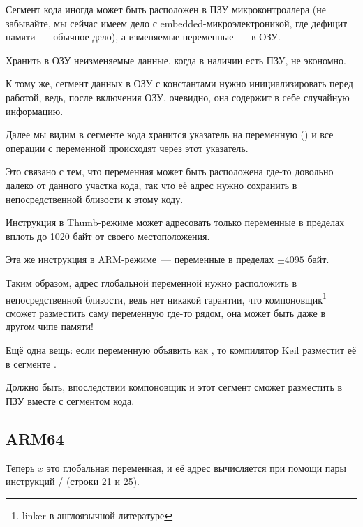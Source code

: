 \myindex{\RAM}
\myindex{\ROM}
Сегмент кода иногда может быть расположен в ПЗУ микроконтроллера (не забывайте, 
мы сейчас имеем дело с embedded-микроэлектроникой, где дефицит памяти~--- обычное дело),
а изменяемые переменные~--- в ОЗУ.

Хранить в ОЗУ неизменяемые данные, когда в наличии есть ПЗУ, не экономно.

К тому же, сегмент данных в ОЗУ с константами нужно инициализировать перед работой,
ведь, после включения ОЗУ, очевидно, она содержит в себе случайную информацию.

Далее мы видим в сегменте кода хранится указатель на переменную  () и 
все операции с переменной происходят через этот указатель.

Это связано с тем, что переменная  может быть расположена где-то довольно далеко от 
данного участка кода, так что её адрес нужно сохранить в непосредственной близости к этому коду.

Инструкция  в Thumb-режиме может адресовать только переменные в пределах вплоть до 1020 байт от своего местоположения.

Эта же инструкция в ARM-режиме~--- переменные в пределах $\pm{}4095$ байт.

Таким образом,
адрес глобальной переменной  нужно расположить в непосредственной близости, ведь нет никакой гарантии, 
что компоновщик\footnote{linker в англоязычной литературе} сможет разместить саму переменную где-то рядом, 
она может быть даже в другом чипе памяти!

\myindex{\ROM}
Ещё одна вещь: если переменную объявить как , то компилятор Keil разместит её в сегменте .

Должно быть, впоследствии компоновщик и этот сегмент сможет разместить в ПЗУ вместе с сегментом кода.

\subsection{ARM64}



Теперь $x$ это глобальная переменная, и её адрес вычисляется при помощи пары инструкций / (строки 21 и 25).

